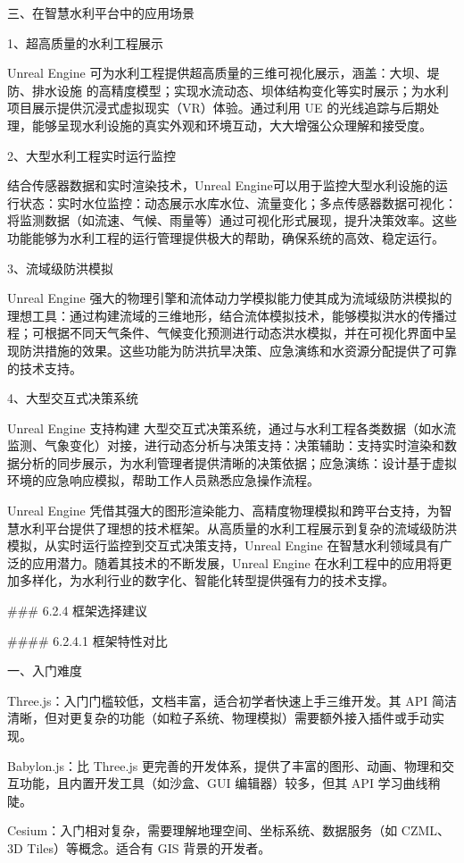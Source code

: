 三、在智慧水利平台中的应用场景

1、超高质量的水利工程展示

Unreal Engine 可为水利工程提供超高质量的三维可视化展示，涵盖：大坝、堤防、排水设施 的高精度模型；实现水流动态、坝体结构变化等实时展示；为水利项目展示提供沉浸式虚拟现实（VR）体验。通过利用 UE 的光线追踪与后期处理，能够呈现水利设施的真实外观和环境互动，大大增强公众理解和接受度。

2、大型水利工程实时运行监控

结合传感器数据和实时渲染技术，Unreal Engine可以用于监控大型水利设施的运行状态：实时水位监控：动态展示水库水位、流量变化；多点传感器数据可视化：将监测数据（如流速、气候、雨量等）通过可视化形式展现，提升决策效率。这些功能能够为水利工程的运行管理提供极大的帮助，确保系统的高效、稳定运行。

3、流域级防洪模拟

Unreal Engine 强大的物理引擎和流体动力学模拟能力使其成为流域级防洪模拟的理想工具：通过构建流域的三维地形，结合流体模拟技术，能够模拟洪水的传播过程；可根据不同天气条件、气候变化预测进行动态洪水模拟，并在可视化界面中呈现防洪措施的效果。这些功能为防洪抗旱决策、应急演练和水资源分配提供了可靠的技术支持。

4、大型交互式决策系统

Unreal Engine 支持构建 大型交互式决策系统，通过与水利工程各类数据（如水流监测、气象变化）对接，进行动态分析与决策支持：决策辅助：支持实时渲染和数据分析的同步展示，为水利管理者提供清晰的决策依据；应急演练：设计基于虚拟环境的应急响应模拟，帮助工作人员熟悉应急操作流程。

Unreal Engine 凭借其强大的图形渲染能力、高精度物理模拟和跨平台支持，为智慧水利平台提供了理想的技术框架。从高质量的水利工程展示到复杂的流域级防洪模拟，从实时运行监控到交互式决策支持，Unreal Engine 在智慧水利领域具有广泛的应用潜力。随着其技术的不断发展，Unreal Engine 在水利工程中的应用将更加多样化，为水利行业的数字化、智能化转型提供强有力的技术支撑。

\#\#\# 6.2.4 框架选择建议

\#\#\#\# 6.2.4.1 框架特性对比

一、入门难度

Three.js：入门门槛较低，文档丰富，适合初学者快速上手三维开发。其 API 简洁清晰，但对更复杂的功能（如粒子系统、物理模拟）需要额外接入插件或手动实现。

Babylon.js：比 Three.js 更完善的开发体系，提供了丰富的图形、动画、物理和交互功能，且内置开发工具（如沙盒、GUI 编辑器）较多，但其 API 学习曲线稍陡。

Cesium：入门相对复杂，需要理解地理空间、坐标系统、数据服务（如 CZML、3D Tiles）等概念。适合有 GIS 背景的开发者。

